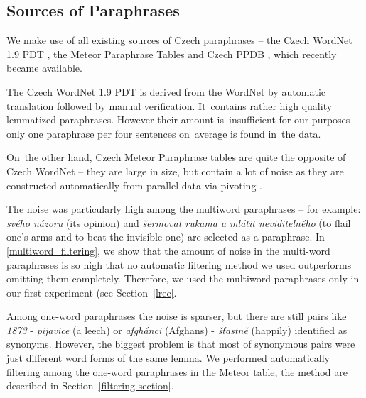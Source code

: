 \documentclass[11pt]{article}
\def\Tref#1{Table~\ref{#1}}
\def\Sref#1{Section~\ref{#1}}
\begin{document}
\subsection{Sources of Paraphrases}
\label{meteori}
We make use of all existing sources of Czech paraphrases -- the Czech WordNet 1.9 PDT 
\cite{czech-wordnet}, the Meteor Paraphrase Tables \cite{meteor-tables} and Czech PPDB %
, which recently became available.

The Czech WordNet 1.9 PDT is derived from the WordNet \cite{wordnet} by automatic translation 
followed by manual verification. It~contains rather high quality lemmatized paraphrases. However 
their amount is~insufficient for our purposes %
- only one paraphrase per four sentences on~average is found in~the data. %

On~the other hand, Czech Meteor Paraphrase tables are quite the opposite of Czech WordNet -- 
they are large in size, but contain a lot of noise as they are constructed automatically 
from parallel data via pivoting \cite{pivoting}. 

The noise was particularly high among the multiword paraphrases -- for example: \textit{svého názoru} 
(its opinion) and \textit{šermovat rukama a mlátit neviditelného} (to flail one's arms and to beat 
the invisible one) are selected as a paraphrase. In \ref{multiword_filtering}, we show that the amount 
of noise in the multi-word paraphrases is so high that no automatic filtering method we used outperforms 
omitting them completely. Therefore, we used the multiword paraphrases only in our first experiment (see
\Sref{lrec}.

Among one-word paraphrases the noise is sparser, but there are still pairs like \textit{1873} - 
\textit{pijavice} (a leech) or \textit{afgh\'{a}nci} (Afghans) - \textit{š\v{t}astně} (happily) 
identified as synonyms. However, the biggest problem is that most of synonymous pairs were just 
different word forms of the same lemma. We performed automatically filtering among the one-word
paraphrases in the Meteor table, the method are described in \Sref{filtering-section}.


\end{document}
